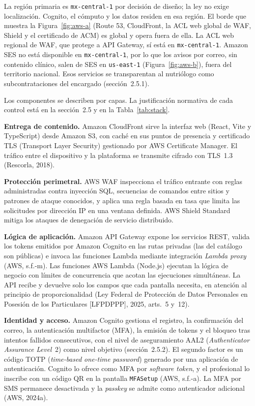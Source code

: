 \documentclass[12pt, a4paper]{article}
\begin{document}
La región primaria es \texttt{mx-central-1} por decisión de diseño; la
ley no exige localización. Cognito, el cómputo y los datos residen en
esa región. El borde que muestra la Figura~\ref{fig:aws-a} (Route 53,
CloudFront, la ACL web global de WAF, Shield y el certificado de ACM) es
global y opera fuera de ella. La ACL web regional de WAF, que protege a
API Gateway, sí está en \texttt{mx-central-1}. Amazon SES no está
disponible en \texttt{mx-central-1}, por lo que los avisos por correo,
sin contenido clínico, salen de SES en \texttt{us-east-1}
(Figura~\ref{fig:aws-b}), fuera del territorio nacional. Esos servicios
se transparentan al nutriólogo como subcontrataciones del encargado
(sección~2.5.1).

Los componentes se describen por capas. La justificación normativa de
cada control está en la sección~2.5 y en la Tabla~\ref{tab:stack}.

\textbf{Entrega de contenido.} Amazon CloudFront sirve la interfaz web
(React, Vite y TypeScript) desde Amazon S3, con caché en sus puntos de
presencia y certificado TLS (Transport Layer Security) gestionado por AWS Certificate Manager. El
tráfico entre el dispositivo y la plataforma se transmite cifrado con
TLS~1.3 (Rescorla, 2018).

\textbf{Protección perimetral.} AWS WAF inspecciona el tráfico entrante
con reglas administradas contra inyección SQL, secuencias de comandos
entre sitios y patrones de ataque conocidos, y aplica una regla basada
en tasa que limita las solicitudes por dirección IP en una ventana
definida. AWS Shield Standard mitiga los ataques de denegación de
servicio distribuido.

\textbf{Lógica de aplicación.} Amazon API Gateway expone los servicios
REST, valida los tokens emitidos por Amazon Cognito en las rutas
privadas (las del catálogo son públicas) e invoca las funciones Lambda mediante integración \textit{Lambda proxy} (AWS,
s.f.-m).
Las funciones AWS Lambda (Node.js) ejecutan la lógica de negocio con
límites de concurrencia que acotan las ejecuciones simultáneas. La API
recibe y devuelve solo los campos que cada pantalla necesita, en
atención al principio de proporcionalidad (Ley Federal de Protección de Datos Personales en Posesión de los Particulares [LFPDPPP], 2025, arts.~5 y~12).

\textbf{Identidad y acceso.} Amazon Cognito gestiona el registro, la
confirmación del correo, la autenticación multifactor (MFA), la emisión
de tokens y el bloqueo tras intentos fallidos consecutivos, con el nivel
de aseguramiento AAL2 (\textit{Authenticator Assurance Level}~2) como
nivel objetivo (sección~2.5.2). El segundo factor es un código TOTP
(\textit{time-based one-time password}) generado por una aplicación de
autenticación. Cognito lo ofrece como MFA por \textit{software token}, y
el profesional lo inscribe con un código QR en la pantalla
\texttt{MFASetup} (AWS, s.f.-a). La MFA por SMS permanece desactivada y
la \textit{passkey} se admite como autenticador adicional (AWS, 2024a).
\end{document}
